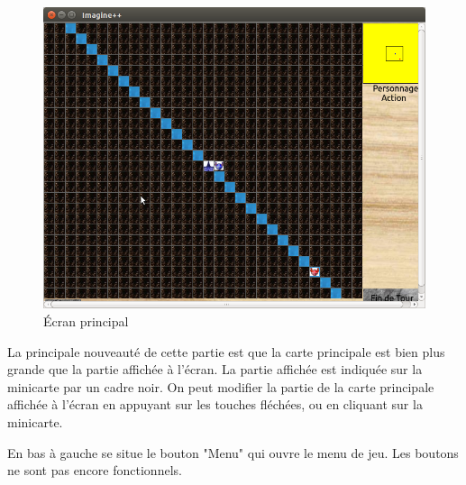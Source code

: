 \documentclass[11pt,a4paper]{article}
\begin{document}
\begin{figure}[h]
\begin{center}
\includegraphics[scale=0.5]{./graphique_principal.png}
\caption{Écran principal}
\end{center}
\end{figure}

La principale nouveauté de cette partie est que la carte principale est bien plus grande que la partie affichée à l'écran. La partie affichée est indiquée sur la minicarte par un cadre noir. On peut modifier la partie de la carte principale affichée à l'écran en appuyant sur les touches fléchées, ou en cliquant sur la minicarte.
~~

En bas à gauche se situe le bouton "Menu" qui ouvre le menu de jeu. Les boutons ne sont pas encore fonctionnels.
\end{document}

